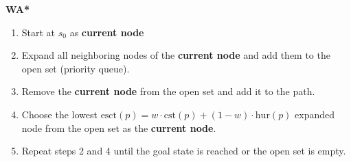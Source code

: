 \begin{process} \textbf{WA*}
    \begin{enumerate}
        \item Start at $s_0$ as \textbf{current node}
        \item Expand all neighboring nodes of the \textbf{current node} and add them to the open set (priority queue).
        \item Remove the \textbf{current node} from the open set and add it to the path. 
        \item Choose the lowest $\text{esct}(p) =  w \cdot \text{cst}(p) + (1-w) \cdot \text{hur}(p)$ expanded node from the open set as the \textbf{current node}.
        \item Repeat steps 2 and 4 until the goal state is reached or the open set is empty.
    \end{enumerate}
\end{process}
\newpage

